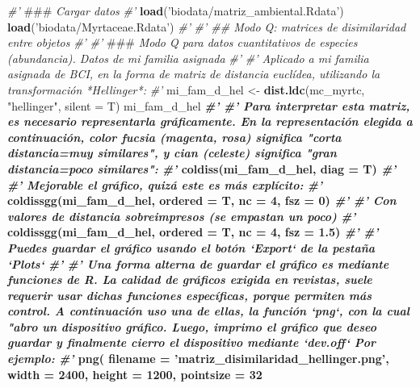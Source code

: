 \documentclass[11pt,]{article}
\newenvironment{Shaded}{\begin{snugshade}}{\end{snugshade}}
\newcommand{\KeywordTok}[1]{\textcolor[rgb]{0.13,0.29,0.53}{\textbf{#1}}}
\newcommand{\DataTypeTok}[1]{\textcolor[rgb]{0.13,0.29,0.53}{#1}}
\newcommand{\DecValTok}[1]{\textcolor[rgb]{0.00,0.00,0.81}{#1}}
\newcommand{\FloatTok}[1]{\textcolor[rgb]{0.00,0.00,0.81}{#1}}
\newcommand{\StringTok}[1]{\textcolor[rgb]{0.31,0.60,0.02}{#1}}
\newcommand{\CommentTok}[1]{\textcolor[rgb]{0.56,0.35,0.01}{\textit{#1}}}
\newcommand{\OperatorTok}[1]{\textcolor[rgb]{0.81,0.36,0.00}{\textbf{#1}}}
\newcommand{\AlertTok}[1]{\textcolor[rgb]{0.94,0.16,0.16}{#1}}
\newcommand{\NormalTok}[1]{#1}
\begin{document}
\begin{Shaded}
\begin{Highlighting}[]
\CommentTok{#' }\AlertTok{###}\CommentTok{ Cargar datos}
\CommentTok{#' }
\KeywordTok{load}\NormalTok{(}\StringTok{'biodata/matriz_ambiental.Rdata'}\NormalTok{)}
\KeywordTok{load}\NormalTok{(}\StringTok{'biodata/Myrtaceae.Rdata'}\NormalTok{)}
\CommentTok{#' }
\CommentTok{#' ## Modo Q: matrices de disimilaridad entre objetos}
\CommentTok{#' }
\CommentTok{#' }\AlertTok{###}\CommentTok{ Modo Q para datos cuantitativos de especies (abundancia). Datos de mi familia asignada}
\CommentTok{#' }
\CommentTok{#' Aplicado a mi familia asignada de BCI, en la forma de matriz de distancia euclídea, utilizando la transformación *Hellinger*:}
\CommentTok{#' }
\NormalTok{mi_fam_d_hel <-}\StringTok{ }\KeywordTok{dist.ldc}\NormalTok{(mc_myrtc, }\StringTok{"hellinger"}\NormalTok{, }\DataTypeTok{silent =}\NormalTok{ T)}
\NormalTok{mi_fam_d_hel }\OperatorTok{%
\CommentTok{#' }
\CommentTok{#' Para interpretar esta matriz, es necesario representarla gráficamente. En la representación elegida a continuación, color fucsia (magenta, rosa) significa "corta distancia=muy similares", y cian (celeste) significa "gran distancia=poco similares":}
\CommentTok{#' }
\KeywordTok{coldiss}\NormalTok{(mi_fam_d_hel, }\DataTypeTok{diag =}\NormalTok{ T)}
\CommentTok{#' }
\CommentTok{#' Mejorable el gráfico, quizá este es más explícito:}
\CommentTok{#' }
\KeywordTok{coldissgg}\NormalTok{(mi_fam_d_hel, }\DataTypeTok{ordered =}\NormalTok{ T, }\DataTypeTok{nc =} \DecValTok{4}\NormalTok{, }\DataTypeTok{fsz =} \DecValTok{0}\NormalTok{)}
\CommentTok{#' }
\CommentTok{#' Con valores de distancia sobreimpresos (se empastan un poco)}
\CommentTok{#' }
\KeywordTok{coldissgg}\NormalTok{(mi_fam_d_hel, }\DataTypeTok{ordered =}\NormalTok{ T, }\DataTypeTok{nc =} \DecValTok{4}\NormalTok{, }\DataTypeTok{fsz =} \FloatTok{1.5}\NormalTok{)}
\CommentTok{#' }
\CommentTok{#' Puedes guardar el gráfico usando el botón `Export` de la pestaña `Plots`}
\CommentTok{#' }
\CommentTok{#' Una forma alterna de guardar el gráfico es mediante funciones de R. La calidad de gráficos exigida en revistas, suele requerir usar dichas funciones específicas, porque permiten más control. A continuación uso una de ellas, la función `png`, con la cual "abro un dispositivo gráfico. Luego, imprimo el gráfico que deseo guardar y finalmente cierro el dispositivo mediante `dev.off` Por ejemplo:}
\CommentTok{#' }
\KeywordTok{png}\NormalTok{(}
  \DataTypeTok{filename =} \StringTok{'matriz_disimilaridad_hellinger.png'}\NormalTok{,}
  \DataTypeTok{width =} \DecValTok{2400}\NormalTok{, }\DataTypeTok{height =} \DecValTok{1200}\NormalTok{, }\DataTypeTok{pointsize =} \DecValTok{32}
}
\end{Highlighting}
\end{Shaded}
\end{document}
